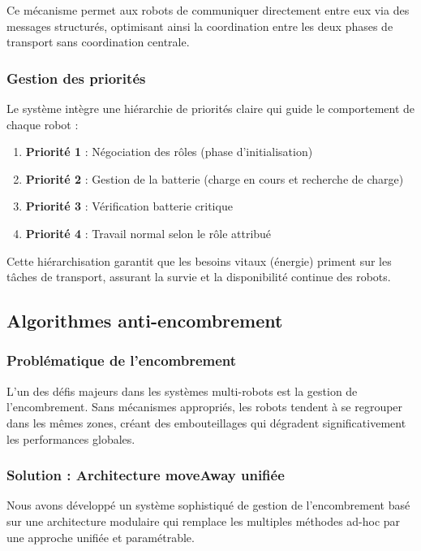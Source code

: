 \documentclass[12pt,a4paper]{article}
\begin{document}
Ce mécanisme permet aux robots de communiquer directement entre eux via des messages structurés, optimisant ainsi la coordination entre les deux phases de transport sans coordination centrale.

\subsubsection{Gestion des priorités}

Le système intègre une hiérarchie de priorités claire qui guide le comportement de chaque robot :

\begin{enumerate}
    \item \textbf{Priorité 1} : Négociation des rôles (phase d'initialisation)
    \item \textbf{Priorité 2} : Gestion de la batterie (charge en cours et recherche de charge)
    \item \textbf{Priorité 3} : Vérification batterie critique
    \item \textbf{Priorité 4} : Travail normal selon le rôle attribué
\end{enumerate}

Cette hiérarchisation garantit que les besoins vitaux (énergie) priment sur les tâches de transport, assurant la survie et la disponibilité continue des robots.

\subsection{Algorithmes anti-encombrement}

\subsubsection{Problématique de l'encombrement}

L'un des défis majeurs dans les systèmes multi-robots est la gestion de l'encombrement. Sans mécanismes appropriés, les robots tendent à se regrouper dans les mêmes zones, créant des embouteillages qui dégradent significativement les performances globales.

\subsubsection{Solution : Architecture moveAway unifiée}

Nous avons développé un système sophistiqué de gestion de l'encombrement basé sur une architecture modulaire qui remplace les multiples méthodes ad-hoc par une approche unifiée et paramétrable.
\end{document}
